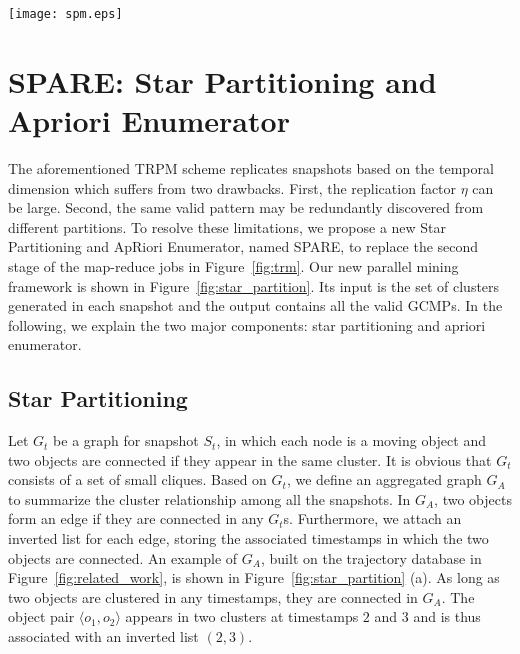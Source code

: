 \begin{figure*}[t]
\centering
\texttt{[image: spm.eps]}
\caption{Star Partitioning and ApRiori Enumerator (SPARE). (a) Aggregated graph $G_A$ generated from Figure 1. (b) Five star partitions are generated from $G_A$. Star IDs are circled, vertexes and inverted lists are in the connected tables.
(c) Apriori Enumerator with various pruning techniques.}
\label{fig:star_partition}
\end{figure*}

\section{SPARE: Star Partitioning and Apriori Enumerator}
\label{sec:spm}
The aforementioned TRPM scheme replicates snapshots based on the temporal dimension which suffers from two drawbacks. First, the replication factor $\eta$ can be large. Second, the same valid pattern may be redundantly discovered from different partitions.
To resolve these limitations,
we propose a new Star Partitioning and ApRiori Enumerator, named SPARE, 
to replace the second stage of the map-reduce jobs in Figure~\ref{fig:trm}. 
Our new parallel mining framework is shown in Figure~\ref{fig:star_partition}. 
Its input is the set of clusters generated in each snapshot and the output 
contains all the valid GCMPs. In the following, we explain the two major components: 
star partitioning and apriori enumerator.


\subsection{Star Partitioning}
Let $G_t$ be a graph for snapshot $S_t$, in which each node 
is a moving object and two objects are connected if they appear 
in the same cluster. It is obvious that $G_t$ consists of a set of small cliques. 
Based on $G_t$, we define an aggregated graph $G_A$ to summarize the 
cluster relationship among all the snapshots. In $G_A$, two objects
form an edge if they are connected in any $G_t$s. Furthermore, 
we attach an inverted list for each edge, 
storing the associated timestamps in which the two objects are connected. 
An example of $G_A$, built on the trajectory database in Figure~\ref{fig:related_work}, 
is shown in Figure~\ref{fig:star_partition} (a). 
As long as two objects are clustered in any timestamps, they are connected in $G_A$. 
The object pair $\langle o_1,o_2 \rangle$ appears in two clusters at timestamps 
$2$ and $3$ and is thus associated with an inverted list $(2,3)$.

